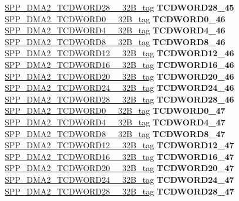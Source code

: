 \begin{DoxyCompactItemize}
\begin{tabbing}
\>\>\mbox{\hyperlink{unionSPP__DMA2__TCDWORD28____32B__tag}{SPP\_DMA2\_TCDWORD28\_\_32B\_tag}} {\bfseries TCDWORD28\_45}\\
\>\>\mbox{\hyperlink{unionSPP__DMA2__TCDWORD0____32B__tag}{SPP\_DMA2\_TCDWORD0\_\_32B\_tag}} {\bfseries TCDWORD0\_46}\\
\>\>\mbox{\hyperlink{unionSPP__DMA2__TCDWORD4____32B__tag}{SPP\_DMA2\_TCDWORD4\_\_32B\_tag}} {\bfseries TCDWORD4\_46}\\
\>\>\mbox{\hyperlink{unionSPP__DMA2__TCDWORD8____32B__tag}{SPP\_DMA2\_TCDWORD8\_\_32B\_tag}} {\bfseries TCDWORD8\_46}\\
\>\>\mbox{\hyperlink{unionSPP__DMA2__TCDWORD12____32B__tag}{SPP\_DMA2\_TCDWORD12\_\_32B\_tag}} {\bfseries TCDWORD12\_46}\\
\>\>\mbox{\hyperlink{unionSPP__DMA2__TCDWORD16____32B__tag}{SPP\_DMA2\_TCDWORD16\_\_32B\_tag}} {\bfseries TCDWORD16\_46}\\
\>\>\mbox{\hyperlink{unionSPP__DMA2__TCDWORD20____32B__tag}{SPP\_DMA2\_TCDWORD20\_\_32B\_tag}} {\bfseries TCDWORD20\_46}\\
\>\>\mbox{\hyperlink{unionSPP__DMA2__TCDWORD24____32B__tag}{SPP\_DMA2\_TCDWORD24\_\_32B\_tag}} {\bfseries TCDWORD24\_46}\\
\>\>\mbox{\hyperlink{unionSPP__DMA2__TCDWORD28____32B__tag}{SPP\_DMA2\_TCDWORD28\_\_32B\_tag}} {\bfseries TCDWORD28\_46}\\
\>\>\mbox{\hyperlink{unionSPP__DMA2__TCDWORD0____32B__tag}{SPP\_DMA2\_TCDWORD0\_\_32B\_tag}} {\bfseries TCDWORD0\_47}\\
\>\>\mbox{\hyperlink{unionSPP__DMA2__TCDWORD4____32B__tag}{SPP\_DMA2\_TCDWORD4\_\_32B\_tag}} {\bfseries TCDWORD4\_47}\\
\>\>\mbox{\hyperlink{unionSPP__DMA2__TCDWORD8____32B__tag}{SPP\_DMA2\_TCDWORD8\_\_32B\_tag}} {\bfseries TCDWORD8\_47}\\
\>\>\mbox{\hyperlink{unionSPP__DMA2__TCDWORD12____32B__tag}{SPP\_DMA2\_TCDWORD12\_\_32B\_tag}} {\bfseries TCDWORD12\_47}\\
\>\>\mbox{\hyperlink{unionSPP__DMA2__TCDWORD16____32B__tag}{SPP\_DMA2\_TCDWORD16\_\_32B\_tag}} {\bfseries TCDWORD16\_47}\\
\>\>\mbox{\hyperlink{unionSPP__DMA2__TCDWORD20____32B__tag}{SPP\_DMA2\_TCDWORD20\_\_32B\_tag}} {\bfseries TCDWORD20\_47}\\
\>\>\mbox{\hyperlink{unionSPP__DMA2__TCDWORD24____32B__tag}{SPP\_DMA2\_TCDWORD24\_\_32B\_tag}} {\bfseries TCDWORD24\_47}\\
\>\>\mbox{\hyperlink{unionSPP__DMA2__TCDWORD28____32B__tag}{SPP\_DMA2\_TCDWORD28\_\_32B\_tag}} {\bfseries TCDWORD28\_47}\\

\end{tabbing}
\end{DoxyCompactItemize}
